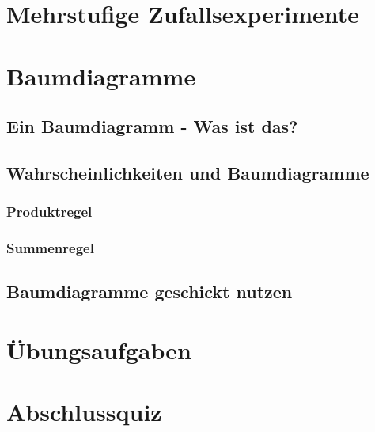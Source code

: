 \documentclass[
  ngerman,
]{book}
\begin{document}
\hypertarget{mehrstufige-zufallsexperimente}{%
\chapter{Mehrstufige Zufallsexperimente}\label{mehrstufige-zufallsexperimente}}

\hypertarget{baumdiagramme}{%
\chapter{Baumdiagramme}\label{baumdiagramme}}

\hypertarget{ein-baumdiagramm---was-ist-das}{%
\section{Ein Baumdiagramm - Was ist das?}\label{ein-baumdiagramm---was-ist-das}}

\hypertarget{wahrscheinlichkeiten-und-baumdiagramme}{%
\section{Wahrscheinlichkeiten und Baumdiagramme}\label{wahrscheinlichkeiten-und-baumdiagramme}}

\hypertarget{produktregel}{%
\subsection{Produktregel}\label{produktregel}}

\hypertarget{summenregel}{%
\subsection{Summenregel}\label{summenregel}}

\hypertarget{baumdiagramme-geschickt-nutzen}{%
\section{Baumdiagramme geschickt nutzen}\label{baumdiagramme-geschickt-nutzen}}

\hypertarget{uxfcbungsaufgaben}{%
\chapter{Übungsaufgaben}\label{uxfcbungsaufgaben}}

\hypertarget{abschlussquiz}{%
\chapter{Abschlussquiz}\label{abschlussquiz}}
\end{document}
